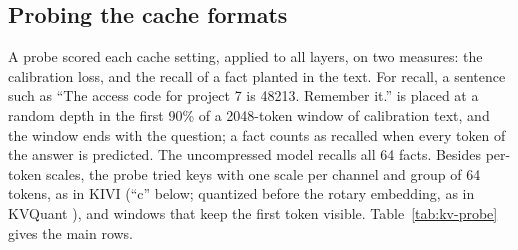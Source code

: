 \documentclass[11pt]{article}
\begin{document}
\subsection{Probing the cache formats}
\label{sec:kv-probe}
A probe scored each cache setting, applied to all layers, on two measures: the calibration loss, and the
recall of a fact planted in the text. For recall, a sentence such as ``The access code for project 7 is
48213. Remember it.'' is placed at a random depth in the first 90\% of a 2048-token window of calibration
text, and the window ends with the question; a fact counts as recalled when every token of the answer is
predicted. The uncompressed model recalls all 64 facts. Besides per-token scales, the probe tried keys with
one scale per channel and group of 64 tokens, as in KIVI \cite{liu2024kivi} (``c'' below; quantized before
the rotary embedding, as in KVQuant \cite{hooper2024kvquant}), and windows that keep the first token
visible. Table~\ref{tab:kv-probe} gives the main rows.
\end{document}
